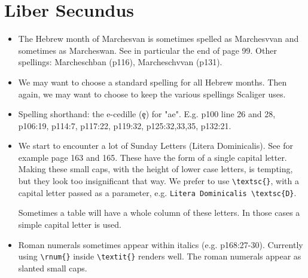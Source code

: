 \documentclass{report}
\begin{document}
\section{Liber Secundus}
\begin{itemize}
\item
The Hebrew month of Marchesvan is sometimes spelled as Marchesvvan and
sometimes as Marcheswan. See in particular the end of page 99.
Other spellings: Marcheschban (p116), Marcheschvvan (p131).
\item
We may want to choose a standard spelling for all Hebrew months.
Then again, we may want to choose to keep the various spellings Scaliger uses.
\item
Spelling shorthand: the e-cedille (ȩ) for "ae".
E.g. p100 line 26 and 28, p106:19, p114:7, p117:22, p119:32,
p125:32,33,35, p132:21.
\item
We start to encounter a lot of Sunday Letters (Litera Dominicalis).
See for example page 163 and 165.
These have the form of a single capital letter.
Making these small caps, with the height of lower case letters,
is tempting, but they look too insignificant that way.
We prefer to use \verb+\textsc{}+, with a capital letter passed as a parameter,
e.g. \verb+Litera Dominicalis \textsc{D}+.

Sometimes a table will have a whole column of these letters.
In those cases a simple capital letter is used.
\item
Roman numerals sometimes appear within italics (e.g. p168:27-30).
Currently using \verb+\rnum{}+ inside \verb+\textit{}+ renders well.
The roman numerals appear as slanted small caps.


\end{itemize}
\end{document}
